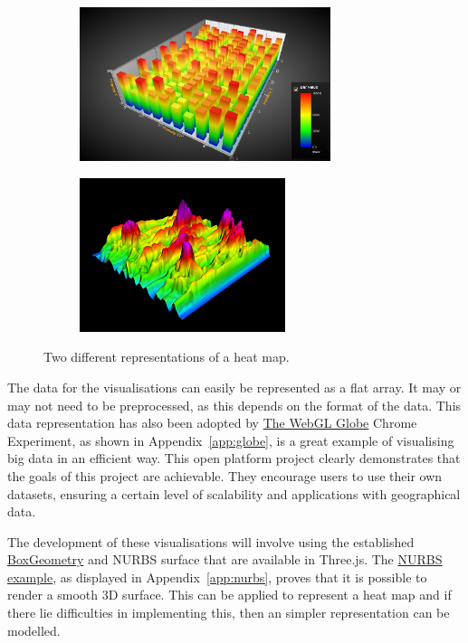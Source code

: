 \documentclass[a4paper]{article}
\begin{document}
{		\begin{figure}[H]
			\begin{subfigure}[b]{0.5\textwidth}
                \includegraphics[width=\textwidth,height=4.5cm]{images/heat-map-1}
	        \end{subfigure}
	        \begin{subfigure}[b]{0.5\textwidth}
                \includegraphics[width=\textwidth,height=4.5cm]{images/heat-map-2}
	        \end{subfigure}
			\caption{Two different representations of a heat map. \citep{tuomainen2014financial} \citep{fuchs2006physiological}}
			\label{fig:heat_maps}
		\end{figure}
		
		The data for the visualisations can easily be represented as a flat array. It may or may not need to be preprocessed, as this depends on the format of the data. This data representation has also been adopted by \href{https://www.chromeexperiments.com/globe}{The WebGL Globe} Chrome Experiment, as shown in Appendix~\ref{app:globe}, is a great example of visualising big data in an efficient way. This open platform project clearly demonstrates that the goals of this project are achievable. They encourage users to use their own datasets, ensuring a certain level of scalability and applications with geographical data.
		
		The development of these visualisations will involve using the established \href{http://threejs.org/docs/#Reference/Extras.Geometries/BoxGeometry}{BoxGeometry} and NURBS surface that are available in Three.js. The \href{http://threejs.org/examples/webgl_geometry_nurbs.html}{NURBS example}, as displayed in Appendix~\ref{app:nurbs}, proves that it is possible to render a smooth 3D surface. This can be applied to represent a heat map and if there lie difficulties in implementing this, then an simpler representation can be modelled.
		
}
\end{document}
